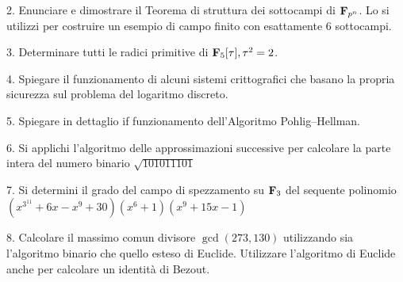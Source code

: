 \item{2.} Enunciare e dimostrare il Teorema di struttura dei sottocampi di ${\bf F}_{p^n}$. Lo si utilizzi per costruire
un esempio di campo finito con esattamente $6$ sottocampi. 
\vfill\eject\ \vskip-2cm

\item{3.} Determinare tutti le radici primitive di ${\bf F}_{5}[\tau], \tau^2=2$.\vfill

\item{4.} Spiegare il funzionamento di alcuni sistemi crittografici che basano la propria sicurezza sul problema del 
logaritmo discreto.\vfill\eject\ \vskip-2cm


\item{5.} Spiegare in dettaglio if funzionamento dell'Algoritmo Pohlig--Hellman.
\vfill

\item{6.} Si applichi l'algoritmo delle approssimazioni successive per calcolare la parte intera del numero binario $\sqrt{101011101}$
\vfill\eject\ \vskip-2cm

\item{7.} Si determini il grado del campo di spezzamento su ${\bf F}_3$ del sequente polinomio $(x^{3^{11}}+6x-x^9+30)(x^6+1)(x^9+15x-1)$
\vfill

\item{8.} Calcolare il massimo comun divisore  $\gcd(273,130)$ utilizzando sia l'algoritmo binario che quello esteso di Euclide. Utilizzare l'algoritmo di Euclide anche per 
calcolare un identit\`a di Bezout.
\vfill \eject\bye

